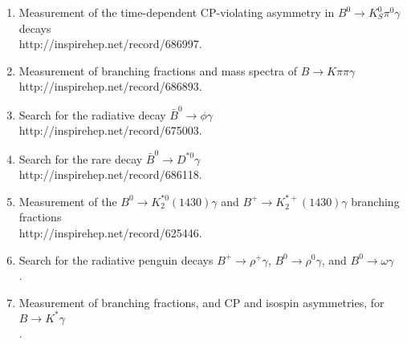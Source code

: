 \documentclass [12pt]{report}
\begin{document}
\begin{enumerate}
\item Measurement of the time-dependent CP-violating asymmetry in $B^0 \rightarrow K^{0}_{S}\pi^0\gamma$ decays\\
{http://inspirehep.net/record/686997}.

\item Measurement of branching fractions and mass spectra of $B \rightarrow K \pi \pi \gamma$\\
{http://inspirehep.net/record/686893}.

\item Search for the radiative decay $\bar{B}^{0}\rightarrow \phi\gamma$\\
{http://inspirehep.net/record/675003}.

\item Search for the rare decay $\bar{B}^{0}\rightarrow D^{*0}\gamma$\\
{http://inspirehep.net/record/686118}.

\item Measurement of the $B^{0}\rightarrow K_{2}^{*0}(1430) \gamma$ and $B^{+}\rightarrow K_{2}^{*+}(1430) \gamma$ branching fractions\\
{http://inspirehep.net/record/625446}.

\item Search for the radiative penguin decays $B^{+}
\rightarrow \rho^{+} \gamma$, $B^{0}
\rightarrow \rho^{0} \gamma$, and $B^{0}
\rightarrow \omega \gamma$\\
.

\item Measurement of branching fractions, and CP and isospin asymmetries, for $B\rightarrow K^{*}\gamma$\\
.


\end{enumerate}
\end{document}
